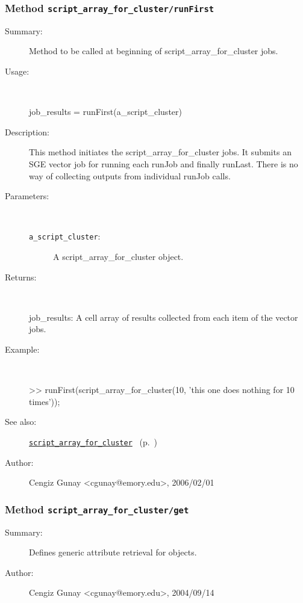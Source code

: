 \subsubsection[Method \texttt{runFirst}]{Method \texttt{script\_array\_for\_cluster/runFirst}}%
%
\label{ref_script_array_for_cluster__runFirst}%
\hypertarget{ref_script_array_for_cluster__runFirst}{}%
\begin{description}
\item[Summary:]Method to be called at beginning of script\_array\_for\_cluster jobs.
%
\item[Usage:]~%
\begin{lyxcode}%
job\_results = runFirst(a\_script\_cluster)
%
\end{lyxcode}%
%
\item[Description:]%
This method initiates the script\_array\_for\_cluster jobs. It submits an SGE vector job for running
 each runJob and finally runLast. There is no way of collecting outputs from 
 individual runJob calls.
\item[Parameters:]~
\begin{description}%
\item[\texttt{a\_script\_cluster}:]
 A script\_array\_for\_cluster object.
\end{description}%
%
\item[Returns:]~

	job\_results: A cell array of results collected from each item of the vector jobs.
%
\item[Example:]~
\begin{lyxcode} >> runFirst(script\_array\_for\_cluster(10, 'this one does nothing for 10 times'));\\%
\end{lyxcode}
%
\item[See also:]%
\hyperlink{ref_script_array_for_cluster}{\texttt{script\_array\_for\_cluster}}%
\ (p.~\pageref{ref_script_array_for_cluster})%
%
%
\item[Author:]%
Cengiz Gunay <cgunay@emory.edu>, 2006/02/01%
\end{description}
\methodline%
\subsubsection[Method \texttt{get}]{Method \texttt{script\_array\_for\_cluster/get}}%
%
\label{ref_script_array_for_cluster__get}%
\hypertarget{ref_script_array_for_cluster__get}{}%
\begin{description}
\item[Summary:]Defines generic attribute retrieval for objects.
%
%
%
%
%
%
%
\item[Author:]%
Cengiz Gunay <cgunay@emory.edu>, 2004/09/14%
\end{description}
\methodline%
